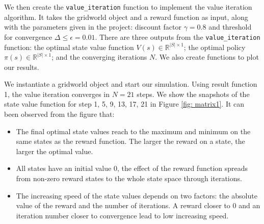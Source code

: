 We then create the \verb"value_iteration" function to implement the value iteration algorithm. It takes the gridworld object and a reward function as input, along with the parameters given in the project: discount factor $\gamma=0.8$ and threshold for convergence $\Delta\leqslant\epsilon=0.01$. There are three outputs from the \verb"value_iteration" function: the optimal state value function $V(s)\in \mathbb{R}^{|S|\times1}$; the optimal policy $\pi (s)\in \mathbb{R}^{|S|\times1}$; and the converging iterations $N$. We also create functions to plot our results.

We instantiate a gridworld object and start our simulation. Using result function 1, the value iteration converges in $N=21$ steps. We show the snapshots of the state value function for step 1, 5, 9, 13, 17, 21 in Figure \ref{fig: matrix1}. It can been observed from the figure that: 
\begin{itemize}
    \item The final optimal state values reach to the maximum and minimum on the same states as the reward function. The larger the reward on a state, the larger the optimal value.
    \item  All states have an initial value 0, the effect of the reward function spreads from non-zero reward states to the whole state space through iterations. 
    \newpage
    \item The increasing speed of the state values depends on two factors: the absolute value of the reward and the number of iterations. A reward closer to 0 and an iteration number closer to convergence lead to low increasing speed.
\end{itemize}


